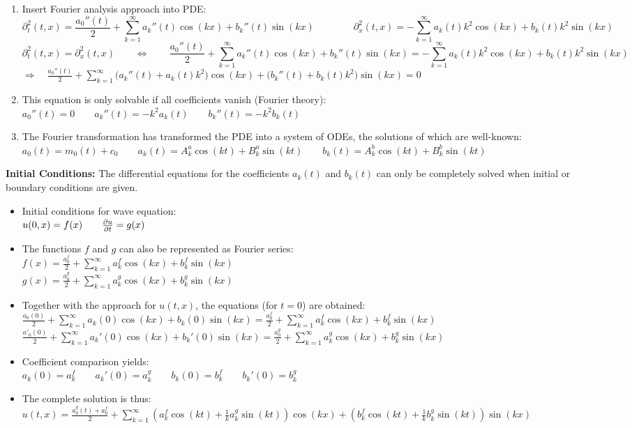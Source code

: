\begin{enumerate}
\item Insert Fourier analysis approach into PDE:\\
$$\partial_t^2(t,x)=\frac{a_0''(t)}{2}+\sum\limits_{k=1}^{\infty}{a_k''(t)\cos(kx)+b_k''(t)\sin(kx)}
\qquad \qquad
\partial_x^2(t,x)=-\sum\limits_{k=1}^{\infty}{a_k(t)k^2\cos(kx)+b_k(t)k^2\sin(kx)}$$
$$\partial_t^2(t,x)=\partial_x^2(t,x)
\qquad \Longleftrightarrow \qquad \frac{a_0''(t)}{2}+\sum\limits_{k=1}^{\infty}{a_k''(t)\cos(kx)+b_k''(t)\sin(kx)}=-\sum\limits_{k=1}^{\infty}{a_k(t)k^2\cos(kx)+b_k(t)k^2\sin(kx)}$$
$\boxed{\Rightarrow\quad \frac{a_0''(t)}{2}+\sum\limits_{k=1}^{\infty}{\big(a_k''(t)+a_k(t)k^2\big)\cos(kx)+\big(b_k''(t)+b_k(t)k^2\big)\sin(kx)}=0}$
\item This equation is only solvable if all coefficients vanish (Fourier theory):\\[0.2cm]
$a_0''(t)=0 \qquad a_k''(t)=-k^2a_k(t)\qquad b_k''(t)=-k^2b_k(t)$
\item The Fourier transformation has transformed the PDE into a system of ODEs, the solutions of which are well-known:\\[0.2cm]
$a_0(t)=m_0(t)+c_0\qquad a_k(t)=A_k^a\cos(kt)+B_k^a\sin(kt)\qquad b_k(t)=A_k^b\cos(kt)+B_k^b\sin(kt)$
\end{enumerate}

\textbf{Initial Conditions:}
The differential equations for the coefficients $a_k(t)$ and $b_k(t)$ can only be completely solved when initial or boundary conditions are given.\\
\begin{itemize}
\item Initial conditions for wave equation:\\
\quad $u(0,x)=f(x)\qquad \frac{\partial u}{\partial t}=g(x)$
\item The functions $f$ and $g$ can also be represented as Fourier series:\\
$f(x)=\frac{a_0^f}{2}+\sum\limits_{k=1}^{\infty}{a^f_k\cos(kx)+b^f_k\sin(kx)}$\\[0.2cm]
$g(x)=\frac{a_0^g}{2}+\sum\limits_{k=1}^{\infty}{a^g_k\cos(kx)+b^g_k\sin(kx)}$
\item Together with the approach for $u(t,x)$, the equations (for $t=0$) are obtained:\\
$\frac{a_0(0)}{2}+\sum\limits_{k=1}^{\infty}{a_k(0)\cos(kx)+b_k(0)\sin(kx)}=\frac{a_0^f}{2}+\sum\limits_{k=1}^{\infty}{a_k^f\cos(kx)+b^f_k\sin(kx)}$\\[0.2cm]
$\frac{a'_0(0)}{2}+\sum\limits_{k=1}^{\infty}{a_k'(0)\cos(kx)+b_k'(0)\sin(kx)}=\frac{a_0^g}{2}+\sum\limits_{k=1}^{\infty}{a_k^g\cos(kx)+b^g_k\sin(kx)}$
\item Coefficient comparison yields:\\
$a_k(0)=a_k^f\qquad a_k'(0)=a_k^g\qquad b_k(0)=b_k^f\qquad b_k'(0)=b_k^g$
\item The complete solution is thus:\\
$u(t,x)=\frac{a_0^g(t)+a_0^f}2+\sum\limits_{k=1}^{\infty}{\left(a_k^f\cos(kt)+\frac 1k a_k^g\sin(kt)\right)\cos(kx)+\left(b_k^f\cos(kt)+\frac 1k b_k^g\sin(kt)\right)}\sin(kx)$
\end{itemize}


